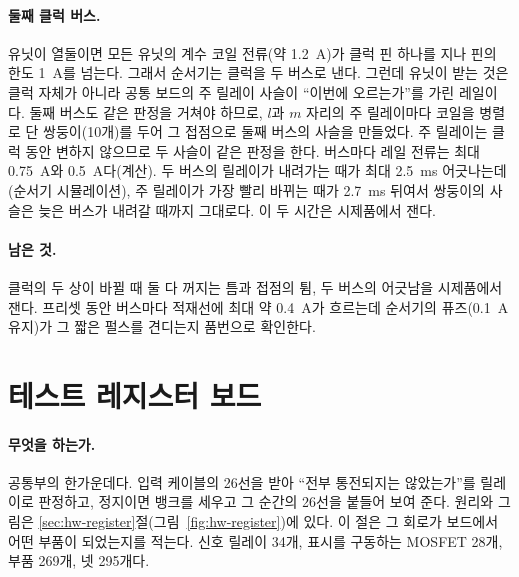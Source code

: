 \paragraph{둘째 클럭 버스.} 유닛이 열둘이면 모든 유닛의 계수 코일 전류(약 1.2~A)가 클럭 핀 하나를 지나 핀의 한도
1~A를 넘는다. 그래서 순서기는 클럭을 두 버스로 낸다. 그런데 유닛이 받는 것은 클럭 자체가 아니라 공통 보드의 주
릴레이 사슬이 ``이번에 오르는가''를 가린 레일이다. 둘째 버스도 같은 판정을 거쳐야 하므로, $l$과 $m$ 자리의 주
릴레이마다 코일을 병렬로 단 쌍둥이(10개)를 두어 그 접점으로 둘째 버스의 사슬을 만들었다. 주 릴레이는 클럭 동안
변하지 않으므로 두 사슬이 같은 판정을 한다. 버스마다 레일 전류는 최대 0.75~A와 0.5~A다(계산). 두 버스의 릴레이가
내려가는 때가 최대 2.5~ms 어긋나는데(순서기 시뮬레이션), 주 릴레이가 가장 빨리 바뀌는 때가 2.7~ms 뒤여서
쌍둥이의 사슬은 늦은 버스가 내려갈 때까지 그대로다. 이 두 시간은 시제품에서 잰다.

\paragraph{남은 것.} 클럭의 두 상이 바뀔 때 둘 다 꺼지는 틈과 접점의 튐, 두 버스의 어긋남을 시제품에서 잰다.
프리셋 동안 버스마다 적재선에 최대 약 0.4~A가 흐르는데 순서기의 퓨즈(0.1~A 유지)가 그 짧은 펄스를 견디는지 품번으로
확인한다.


\section{테스트 레지스터 보드}\label{sch:test-register}

\paragraph{무엇을 하는가.} 공통부의 한가운데다. 입력 케이블의 26선을 받아 ``전부 통전되지는 않았는가''를
릴레이로 판정하고, 정지이면 뱅크를 세우고 그 순간의 26선을 붙들어 보여 준다. 원리와 그림은
\ref{sec:hw-register}절(그림~\ref{fig:hw-register})에 있다. 이 절은 그 회로가 보드에서 어떤 부품이 되었는지를
적는다. 신호 릴레이 34개, 표시를 구동하는 MOSFET 28개, 부품 269개, 넷 295개다.

